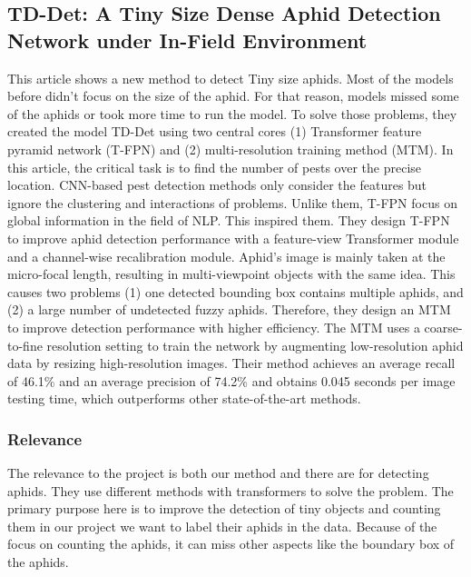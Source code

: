 \documentclass{article}
\begin{document}
\subsection*{TD-Det: A Tiny Size Dense Aphid Detection Network under In-Field Environment \cite{TDDET}}

This article shows a new method to detect Tiny size aphids. Most of the models before didn't focus on the
size of the aphid. For that reason, models missed some of the aphids or took more time to run the model.
To solve those problems, they created the model TD-Det using two central cores (1) Transformer feature pyramid network
(T-FPN) and (2) multi-resolution training method (MTM). In this article, the critical task is to
find the number of pests over the precise location. CNN-based pest detection methods only consider the features
but ignore the clustering and interactions of problems. Unlike them, T-FPN focus on global
information in the field of NLP. This inspired them. They design T-FPN to improve aphid detection
performance with a feature-view Transformer module and a channel-wise recalibration module.
Aphid's image is mainly taken at the micro-focal length, resulting in multi-viewpoint objects with the same idea.
This causes two problems (1) one detected bounding box contains multiple aphids, and (2) a large number of undetected
fuzzy aphids. Therefore, they design an MTM to improve detection performance with higher efficiency.
The MTM uses a coarse-to-fine resolution setting to train the network by augmenting low-resolution aphid data
by resizing high-resolution images. Their method achieves an average recall of 46.1\% and an average precision of 74.2\%
and obtains 0.045 seconds per image testing time, which outperforms other state-of-the-art methods.

\subsubsection*{Relevance}
The relevance to the project is both our method and there are for detecting aphids.
They use different methods with transformers to solve the problem.
The primary purpose here is to improve the detection of tiny objects and counting them in our project we want to
label their aphids in the data. Because of the focus on counting the aphids,
it can miss other aspects like the boundary box of the aphids.
\end{document}
